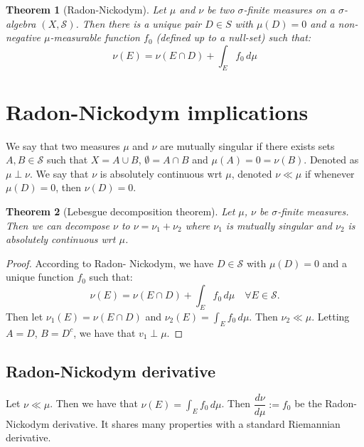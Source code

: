 \documentclass{article}
\newtheorem{theorem}{Theorem}
\theoremstyle{definition}
\numberwithin{theorem}{section}
\numberwithin{equation}{section}
\begin{document}
\begin{theorem}[Radon-Nickodym]
	Let $\mu$ and $\nu$ be two $\sigma$-finite measures on a $\sigma$-algebra $(X, \mathcal{S})$. Then there is a unique pair $D \in S$ with $\mu(D) = 0$ and a non-negative $\mu$-measurable function $f_0$ (defined up to a null-set) such that:
	\begin{equation}
		\nu(E) = \nu(E \cap D) + \int_E f_0 \, d\mu
	\end{equation}
\end{theorem}

\section{Radon-Nickodym implications}
We say that two measures $\mu$ and $\nu$ are mutually singular if there exists sets $A, B \in \mathcal{S}$ such that $X = A \cup B$, $\emptyset = A \cap B$ and $\mu(A) = 0 = \nu(B)$. Denoted as $\mu \perp \nu$.
We say that $\nu$ is absolutely continuous wrt $\mu$, denoted $\nu \ll \mu$ if whenever $\mu(D) = 0$, then $\nu(D) = 0$. 

\begin{theorem}[Lebesgue decomposition theorem]
	Let $\mu$, $\nu$ be $\sigma$-finite measures. Then we can decompose $\nu$ to $\nu = \nu_1 + \nu_2$ where $\nu_1$ is mutually singular and $\nu_2$ is absolutely continuous wrt $\mu$. 
\end{theorem}
\begin{proof}
	According to Radon- Nickodym, we have $D \in \mathcal{S}$ with $\mu(D) = 0$ and a unique function $f_0$ such that:
	\begin{equation}
		\nu(E) = \nu(E \cap D) + \int_E f_0 \, d\mu \quad \forall E \in \mathcal{S}.
	\end{equation}
	Then let $\nu_1(E) = \nu(E \cap D)$ and $\nu_2(E) = \int_E f_0 \, d\mu$. Then $\nu_2 \ll \mu$. Letting $A = D$, $B = D^c$, we have that $v_1 \perp \mu$. 
\end{proof}

\subsection{Radon-Nickodym derivative}
Let $\nu \ll \mu$. Then we have that $\nu(E) = \int_E f_0 \, d\mu$. Then $\dfrac{d\nu}{d\mu} := f_0$ be the Radon-Nickodym derivative. It shares many properties with a standard Riemannian derivative.
\end{document}
